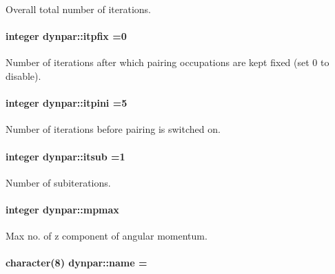 Overall total number of iterations. 

\paragraph[{\texorpdfstring{itpfix}{itpfix}}]{\setlength{\rightskip}{0pt plus 5cm}integer dynpar\+::itpfix =0}\hypertarget{namespacedynpar_ad7ea186e7f9cdd4eeef2e37658dc4ec5}{}\label{namespacedynpar_ad7ea186e7f9cdd4eeef2e37658dc4ec5}


Number of iterations after which pairing occupations are kept fixed (set 0 to disable). 

\paragraph[{\texorpdfstring{itpini}{itpini}}]{\setlength{\rightskip}{0pt plus 5cm}integer dynpar\+::itpini =5}\hypertarget{namespacedynpar_afe6486ebd1f5ec51b5bd80422ee2bf9a}{}\label{namespacedynpar_afe6486ebd1f5ec51b5bd80422ee2bf9a}


Number of iterations before pairing is switched on. 

\paragraph[{\texorpdfstring{itsub}{itsub}}]{\setlength{\rightskip}{0pt plus 5cm}integer dynpar\+::itsub =1}\hypertarget{namespacedynpar_abb878319b6c5e1ba747ec88b09fe364f}{}\label{namespacedynpar_abb878319b6c5e1ba747ec88b09fe364f}


Number of subiterations. 

\paragraph[{\texorpdfstring{mpmax}{mpmax}}]{\setlength{\rightskip}{0pt plus 5cm}integer dynpar\+::mpmax}\hypertarget{namespacedynpar_a920d02babff72b0b7d4bc33c4c303c37}{}\label{namespacedynpar_a920d02babff72b0b7d4bc33c4c303c37}


Max no. of z component of angular momentum. 

\paragraph[{\texorpdfstring{name}{name}}]{\setlength{\rightskip}{0pt plus 5cm}character(8) dynpar\+::name =\textquotesingle{}\textquotesingle{}}\hypertarget{namespacedynpar_a83d064b3d6c076b1252ddd73abe88d54}{}\label{namespacedynpar_a83d064b3d6c076b1252ddd73abe88d54}
